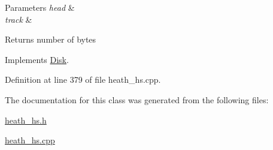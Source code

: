 \begin{DoxyParams}{Parameters}
{\em head} & \\
\hline
{\em track} & \\
\hline
\end{DoxyParams}
\begin{DoxyReturn}{Returns}
number of bytes 
\end{DoxyReturn}


Implements \hyperlink{classDisk}{Disk}.



Definition at line 379 of file heath\+\_\+hs.\+cpp.



The documentation for this class was generated from the following files\+:\begin{DoxyCompactItemize}
\item 
\hyperlink{heath__hs_8h}{heath\+\_\+hs.\+h}\item 
\hyperlink{heath__hs_8cpp}{heath\+\_\+hs.\+cpp}\end{DoxyCompactItemize}
